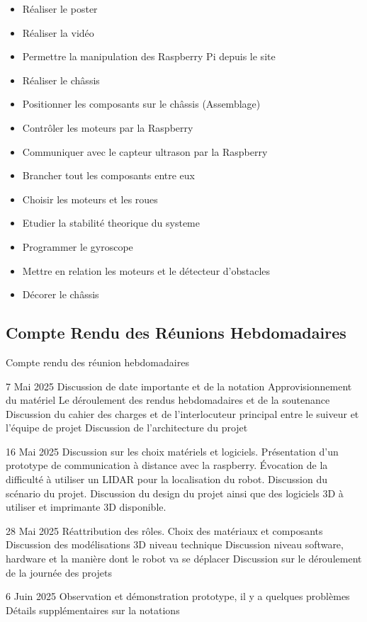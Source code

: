 \documentclass[a4paper,12pt]{report}  %
\begin{document}
\begin{itemize}
	\item Réaliser le poster
	\item Réaliser la vidéo
	\item Permettre la manipulation des Raspberry Pi depuis le site
	\item Réaliser le châssis
	\item Positionner les composants sur le châssis (Assemblage)
	\item Contrôler les moteurs par la Raspberry
	\item Communiquer avec le capteur ultrason par la Raspberry
	\item Brancher tout les composants entre eux
	\item Choisir les moteurs et les roues
	\item Etudier la stabilité theorique du systeme 
	\item Programmer le gyroscope
	\item Mettre en relation les moteurs et le détecteur d'obstacles
	\item Décorer le châssis
\end{itemize}


\subsection{Compte Rendu des Réunions Hebdomadaires}
Compte rendu des réunion hebdomadaires

7 Mai 2025 
Discussion de date importante et de la notation 
Approvisionnement du matériel 
Le déroulement des rendus hebdomadaires et de la soutenance
Discussion du cahier des charges et de l'interlocuteur principal entre le suiveur et l’équipe de projet
Discussion de l’architecture du projet


16 Mai 2025
Discussion sur les choix matériels et logiciels.
Présentation d'un prototype de communication à distance avec la raspberry.
Évocation de la difficulté à utiliser un LIDAR pour la localisation du robot.
Discussion du scénario du projet.
Discussion du design du projet ainsi que des logiciels 3D à utiliser et imprimante 3D disponible.


28 Mai 2025
Réattribution des rôles.
Choix des matériaux et composants
Discussion des modélisations 3D niveau technique
Discussion niveau software, hardware et la manière dont le robot va se déplacer
Discussion sur le déroulement de la journée des projets


6 Juin 2025
Observation et démonstration prototype, il y a quelques problèmes
Détails supplémentaires sur la notations
\end{document}
